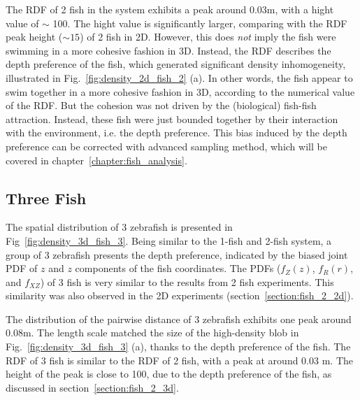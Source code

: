 \documentclass[11pt,twoside]{report}
\begin{document}
The RDF of 2 fish in the system exhibits a peak around 0.03m, with a hight value of $\sim$ 100. The hight value is significantly larger, comparing with the RDF peak height ($\sim 15$) of 2 fish in 2D.
However, this does \emph{not} imply the fish were swimming in a more cohesive fashion in 3D. Instead, 
the RDF describes the depth preference of the fish, which generated significant density inhomogeneity, illustrated in Fig.~\ref{fig:density_2d_fish_2} (a).
In other words, the fish appear to swim together in a more cohesive fashion in 3D, according to the numerical value of the RDF. But the cohesion was not driven by the (biological) fish-fish attraction.
Instead, these fish were just bounded together by their interaction with the environment, i.e. the depth preference.
This bias induced by the depth preference can be corrected with advanced sampling method, which will be covered in chapter~\ref{chapter:fish_analysis}.


\subsection{Three Fish}
\label{section:fish_3_3d}

The spatial distribution of 3 zebrafish is presented in Fig~\ref{fig:density_3d_fish_3}. Being similar to the 1-fish and 2-fish system, a group of 3 zebrafish presents the depth preference, indicated by the biased joint PDF of $z$ and $z$ components of the fish coordinates. The PDFs ($f_Z(z)$, $f_R(r)$, and $f_{XZ}$) of 3 fish is very similar to the results from 2 fish experiments. This similarity was also observed in the 2D experiments (section~\ref{section:fish_2_2d}).

The distribution of the pairwise distance of 3 zebrafish exhibits one peak around 0.08m. The length scale matched the size of the high-density blob in Fig.~\ref{fig:density_3d_fish_3} (a), thanks to the depth preference of the fish. The RDF of 3 fish is similar to the RDF of 2 fish, with a peak at around 0.03 m. The height of the peak is close to 100, due to the depth preference of the fish, as discussed in section~\ref{section:fish_2_3d}.
\end{document}
